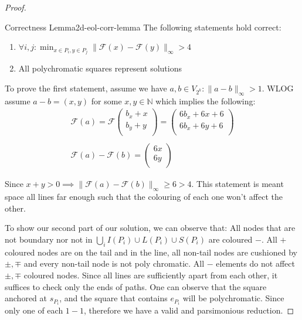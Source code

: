 \begin{proof}
    \begin{lemmabox}{Correctness Lemma}{2d-eol-corr-lemma}
        The following statements hold correct:
        \begin{enumerate}
            \item $\forall i,j: \min_{x \in P_{i}, y\in P_{j}} \|\mathcal{F}(x) - \mathcal{F}(y) \|_{\infty} > 4$
            \item All polychromatic squares represent solutions
        \end{enumerate}
    \end{lemmabox}

    To prove the first statement, assume we have  $a,b \in V_{2^k}: \|a - b\|_{\infty} > 1$. WLOG assume
    $a -b = (x,y)$ for some $x,y \in \mathbb{N}$ which implies the following:
    \begin{gather*}
        \mathcal{F}(a) = \mathcal{F}\begin{pmatrix}
            b_{x} + x \\
            b_{y} + y \\
        \end{pmatrix} = \begin{pmatrix}
            6b_{x}+6x + 6 \\
            6b_{x}+6y + 6 \\
        \end{pmatrix} \\ \\
        \mathcal{F}(a) - \mathcal{F}(b) =  \begin{pmatrix}
            6x \\
            6y \\
        \end{pmatrix}
    \end{gather*}

    Since $x + y > 0 \implies \|\mathcal{F}(a) - \mathcal{F}(b)\|_{\infty} \geq 6 > 4$.  This statement is meant space all lines far enough such that the colouring
    of each one won't affect the other.

    To show our second part of our solution, we can observe that:
    All nodes that are not boundary nor not in $\bigcup_{i }I(P_{i}) \cup L(P_{i}) \cup S(P_{i})$ are coloured $-$.
    All $+$ coloured nodes are on the tail and in the line, all non-tail nodes are cushioned by $\pm, \mp$ and every non-tail node is not poly chromatic.
    All $-$ elements do not affect $\pm,\mp$  coloured nodes.
    Since all lines are sufficiently apart from each other, it suffices to check only the ends of paths.
    One can observe that the square anchored at $s_{P_{i}}$, and the square that contains $e_{P_{i}}$ will be polychromatic.
    Since only one of each $1-1$, therefore we have a valid and parsimonious reduction.
\end{proof}

